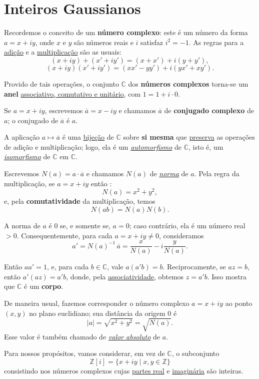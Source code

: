 \section*{Inteiros Gaussianos}

Recordemos o conceito de um \textbf{número complexo}: este é um número da forma 
$a = x + iy$, onde $x$ e $y$ são números reais e $i$ satisfaz $i^2 = -1$. 
As regras para a \underline{adição} e a \underline{multiplicação} são as usuais:
\[
    (x + iy) + (x' + iy') = (x + x') + i(y + y'),
\]
\[
    (x + iy)(x' + iy') = (xx' - yy') + i(yx' + xy').
\]

Provido de tais operações, o conjunto $\mathbb{C}$ dos \textbf{números complexos} torna-se um \textbf{anel}
\underline{associativo, comutativo e unitário}, com $1 = 1 + i \cdot 0$.  

Se $a = x + iy$, escrevemos $\boxed{\overline{a} = x - iy}$ e chamamos $\overline{a}$ de 
\textbf{conjugado complexo} de $a$; o conjugado de $\overline{a}$ é $a$.  

A aplicação $a \mapsto \overline{a}$ é uma \underline{bijeção} de $\mathbb{C}$ sobre \textbf{si mesma} que 
\underline{preserva} as operações de adição e multiplicação; logo, ela é um \underline{\textit{automorfismo}} de 
$\mathbb{C}$, isto é, um \underline{\textit{isomorfismo}} de $\mathbb{C}$ em $\mathbb{C}$.

Escrevemos $N(a) = a \cdot \overline{a}$ e chamamos $N(a)$ de \underline{\textit{norma}} de $a$.  
Pela regra da multiplicação, se $a = x + iy$ então : 
\[
N(a) = x^2 + y^2,
\]
e, pela \textbf{comutatividade} da multiplicação, temos
\[
N(ab) = N(a)N(b).
\]

A norma de $a$ é $0$ se, e somente se, $a = 0$; caso contrário, ela é um número real $> 0$.  
Consequentemente, para cada $a = x + iy \neq 0$, consideramos
\[
a' = N(a)^{-1}\,\overline{a} = \frac{x}{N(a)} - i\frac{y}{N(a)}.
\]

\noindent Então $aa' = 1$, e, para cada $b \in \mathbb{C}$, vale $a(a'b) = b$.  
Reciprocamente, se $az = b$, então $a'(az) = a'b$, donde, pela \underline{associatividade}, obtemos 
$z = a'b$. Isso mostra que $\mathbb{C}$ é um \textbf{corpo}.

De maneira usual, fazemos corresponder o número complexo 
$a = x + iy$ ao ponto $(x,y)$ no plano euclidiano; sua distância da origem $0$ é
\[
|a| = \sqrt{x^2 + y^2} = \sqrt{N(a)}.
\]
Esse valor é também chamado de \underline{\textit{valor absoluto}} de $a$.

\vspace{0.2cm}
\noindent Para nossos propósitos, vamos considerar, em vez de $\mathbb{C}$, o subconjunto 
\[
\mathbb{Z}[i] = \{x + iy \mid x, y \in \mathbb{Z}\}
\]
consistindo nos números complexos cujas \underline{partes real} e \underline{imaginária} são inteiras.  

